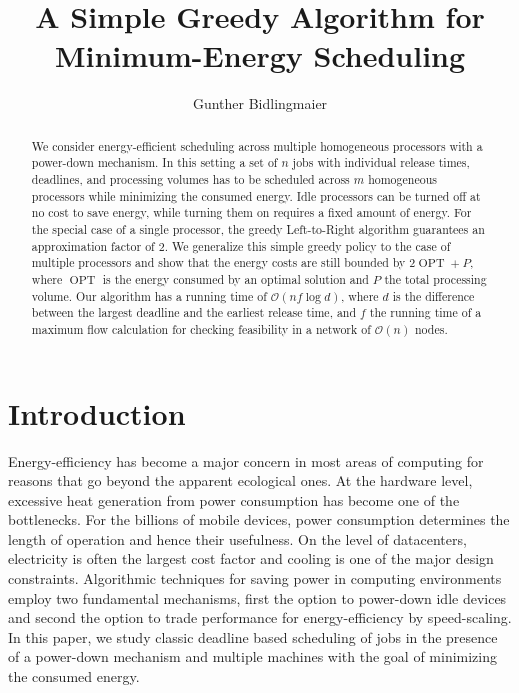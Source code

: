 \documentclass[a4paper]{article}
\title{A Simple Greedy Algorithm for Minimum-Energy Scheduling}
\author{Gunther Bidlingmaier}
\DeclareMathOperator{\OPT}{OPT}
\begin{document}
%

\maketitle
\begin{abstract}
  We consider energy-efficient scheduling across multiple homogeneous processors with a power-down mechanism.
  In this setting a set of $n$ jobs with individual release times, deadlines, and processing volumes has to be scheduled across $m$ homogeneous processors while minimizing the consumed energy.
  Idle processors can be turned off at no cost to save energy, while turning them on requires a fixed amount of energy.
  For the special case of a single processor, the greedy Left-to-Right algorithm guarantees an approximation factor of $2$.
  We generalize this simple greedy policy to the case of multiple processors and show that the energy costs are still bounded by $2 \OPT + P$, where $\OPT$ is the energy consumed by an optimal solution and $P$ the total processing volume.
  Our algorithm has a running time of $\mathcal{O}(n f \log d)$, where $d$ is the difference between the largest deadline and the earliest release time, and $f$ the running time of a maximum flow calculation for checking feasibility in a network of $\mathcal{O}(n)$ nodes.
\end{abstract}


\section{Introduction}
Energy-efficiency has become a major concern in most areas of computing for reasons that go beyond the apparent ecological ones.
At the hardware level, excessive heat generation from power consumption has become one of the bottlenecks.
For the billions of mobile devices, power consumption determines the length of operation and hence their usefulness.
On the level of datacenters, electricity is often the largest cost factor and cooling is one of the major design constraints.
Algorithmic techniques for saving power in computing environments employ two fundamental mechanisms, first the option to power-down idle devices and second the option to trade performance for energy-efficiency by speed-scaling.
In this paper, we study classic deadline based scheduling of jobs in the presence of a power-down mechanism and multiple machines with the goal of minimizing the consumed energy.
\end{document}
